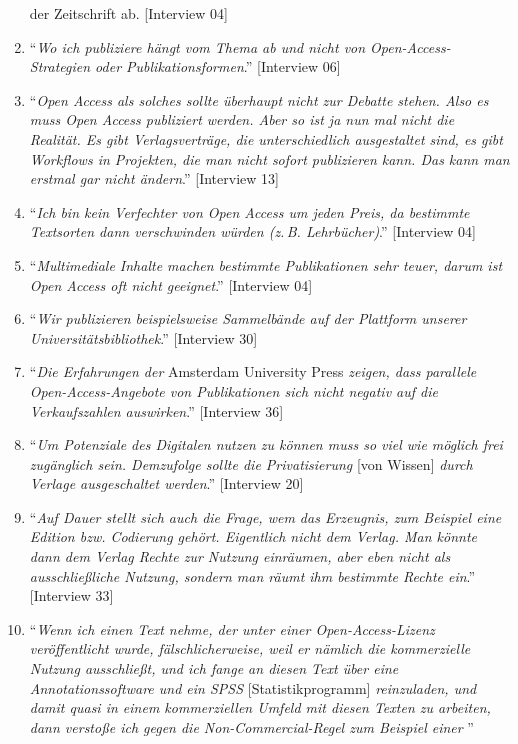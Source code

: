 \documentclass[a4paper,
fontsize=11pt,
oneside,
numbers=noperiodatend,
parskip=half-,
bibliography=totoc,
final
]{scrartcl}
\begin{document}
\begin{enumerate}
{{  der Zeitschrift ab}.} {[}Interview 04{]}
\item
  \enquote{\emph{Wo ich publiziere hängt vom Thema ab und nicht von
  Open-Access-Strategien oder Publikationsformen}.} {[}Interview 06{]}
\item
  \enquote{\emph{Open Access als solches sollte überhaupt nicht zur
  Debatte stehen. Also es muss Open Access publiziert werden. Aber so
  ist ja nun mal nicht die Realität. Es gibt Verlagsverträge, die
  unterschiedlich ausgestaltet sind, es gibt Workflows in Projekten, die
  man nicht sofort publizieren kann. Das kann man erstmal gar nicht
  ändern}.} {[}Interview 13{]}
\item
  \enquote{\emph{Ich bin kein Verfechter von Open Access um jeden Preis,
  da bestimmte Textsorten dann verschwinden würden (z.\,B. Lehrbücher)}.}
  {[}Interview 04{]}
\item
  \enquote{\emph{Multimediale Inhalte machen bestimmte Publikationen
  sehr teuer, darum ist Open Access oft nicht geeignet}.} {[}Interview
  04{]}
\item
  \enquote{\emph{Wir publizieren beispielsweise Sammelbände auf der
  Plattform unserer Universitätsbibliothek}.} {[}Interview 30{]}
\item
  \enquote{\emph{Die Erfahrungen der} Amsterdam University Press
  \emph{zeigen, dass parallele Open-Access-Angebote von Publikationen
  sich nicht negativ auf die Verkaufszahlen auswirken}.} {[}Interview
  36{]}
\item
  \enquote{\emph{Um Potenziale des Digitalen nutzen zu können muss so
  viel wie möglich frei zugänglich sein. Demzufolge sollte die
  Privatisierung} {[}von Wissen{]} \emph{durch Verlage ausgeschaltet
  werden}.} {[}Interview 20{]}
\item
  \enquote{\emph{Auf Dauer stellt sich auch die Frage, wem das
  Erzeugnis, zum Beispiel eine Edition bzw. Codierung gehört. Eigentlich
  nicht dem Verlag. Man könnte dann dem Verlag Rechte zur Nutzung
  einräumen, aber eben nicht als ausschließliche Nutzung, sondern man
  räumt ihm bestimmte Rechte ein}.} {[}Interview 33{]}
\item
  \enquote{\emph{Wenn ich einen Text nehme, der unter einer
  Open-Access-Lizenz veröffentlicht wurde, fälschlicherweise, weil er
  nämlich die kommerzielle Nutzung ausschließt, und ich fange an diesen
  Text über eine Annotationssoftware und ein SPSS}
  {[}Statistikprogramm{]} \emph{reinzuladen, und damit quasi in einem
  kommerziellen Umfeld mit diesen Texten zu arbeiten, dann verstoße ich
  gegen die Non-Commercial-Regel zum Beispiel einer
}}
\end{enumerate}
\end{document}
